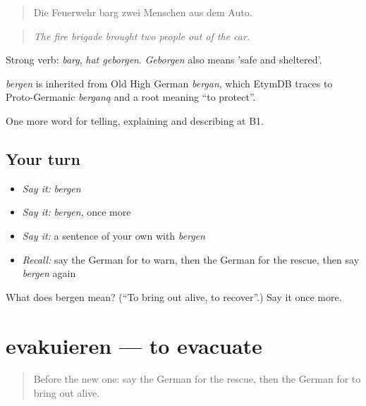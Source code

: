\begin{quote}
Die Feuerwehr barg zwei Menschen aus dem Auto.
\end{quote}

\begin{quote}
\emph{The fire brigade brought two people out of the car.}
\end{quote}

Strong verb: \emph{barg}, \emph{hat geborgen}. \emph{Geborgen} also means 'safe and sheltered'.

\begin{cousinweb}
\emph{bergen} is inherited from Old High German \emph{bergan}, which EtymDB traces to Proto-Germanic \emph{berganą} and a root meaning \textquotedblleft{}to protect\textquotedblright{}.
\end{cousinweb}

\begin{grammarlens}[title={What you've built}]
One more word for telling, explaining and describing at B1.
\end{grammarlens}

\subsection*{Your turn}
\begin{itemize}
\raggedright
  \item \emph{Say it:} \emph{bergen}
  \item \emph{Say it:} \emph{bergen}, once more
  \item \emph{Say it:} a sentence of your own with \emph{bergen}
  \item \emph{Recall:} say the German for to warn, then the German for the rescue, then say \emph{bergen} again
\end{itemize}

\begin{tcolorbox}[breakable,colback=teal!4,colframe=teal!35!black,title={Before you move on}]
What does bergen mean? (\textquotedblleft{}To bring out alive, to recover\textquotedblright{}.) Say it once more.
\end{tcolorbox}
\section[evakuieren]{evakuieren — to evacuate}

\label{lesson:GE-C292-evakuieren}



\begin{quote}
Before the new one: say the German for the rescue, then the German for to bring out alive.
\end{quote}

